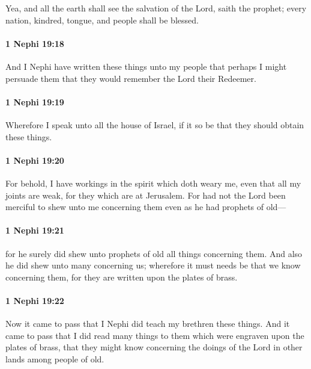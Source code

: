 			Yea, and all the earth shall see the salvation of the Lord, saith the prophet;
			every nation, kindred, tongue, and people shall be blessed.

		\paragraph{1 Nephi 19:18} %
			\label{1NEPHI-19-18}

			And I Nephi have written these things unto my people
			that perhaps I might persuade them
			that they would remember the Lord their Redeemer.

		\paragraph{1 Nephi 19:19} %
			\label{1NEPHI-19-19}

			Wherefore I speak unto all the house of Israel,
			if it so be that they should obtain these things.

		\paragraph{1 Nephi 19:20} %
			\label{1NEPHI-19-20}

			For behold, I have workings in the spirit which doth weary me,
			even that all my joints are weak,
			for they which are at Jerusalem.
			For had not the Lord been merciful
			to shew unto me concerning them
			even as he had prophets of old---

		\paragraph{1 Nephi 19:21} %
			\label{1NEPHI-19-21}

			for he surely did shew unto prophets of old all things concerning them.
			And also he did shew unto many concerning us;
			wherefore it must needs be that we know concerning them,
			for they are written upon the plates of brass.

		\paragraph{1 Nephi 19:22} %
			\label{1NEPHI-19-22}

			Now it came to pass that I Nephi did teach my brethren these things.
			And it came to pass that I did read many things to them
			which were engraven upon the plates of brass,
			that they might know concerning the doings of the Lord
			in other lands among people of old.

